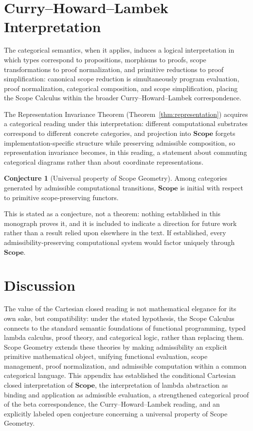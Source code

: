\documentclass[11pt,twoside,openright]{book}
\numberwithin{equation}{chapter}
\theoremstyle{definition}
\theoremstyle{plain}
\theoremstyle{remark}
\theoremstyle{definition}
\newtheorem{conjecture}[definition]{Conjecture}
\newcommand{\CatScope}{\mathbf{Scope}}
\begin{document}
\section{Curry--Howard--Lambek Interpretation}

The categorical semantics, when it applies, induces a logical
interpretation in which types correspond to propositions, morphisms to
proofs, scope transformations to proof normalization, and primitive
reductions to proof simplification: canonical scope reduction is
simultaneously program evaluation, proof normalization, categorical
composition, and scope simplification, placing the Scope Calculus within
the broader Curry--Howard--Lambek correspondence.

The Representation Invariance Theorem (Theorem~\ref{thm:representation})
acquires a categorical reading under this interpretation: different
computational substrates correspond to different concrete categories, and
projection into $\CatScope$ forgets implementation-specific structure
while preserving admissible composition, so representation invariance
becomes, in this reading, a statement about commuting categorical
diagrams rather than about coordinate representations.

\begin{conjecture}[Universal property of Scope Geometry]
Among categories generated by admissible computational transitions,
$\CatScope$ is initial with respect to primitive scope-preserving
functors.
\end{conjecture}

This is stated as a conjecture, not a theorem: nothing established in
this monograph proves it, and it is included to indicate a direction for
future work rather than a result relied upon elsewhere in the text. If
established, every admissibility-preserving computational system would
factor uniquely through $\CatScope$.

\section{Discussion}

The value of the Cartesian closed reading is not mathematical elegance
for its own sake, but compatibility: under the stated hypothesis, the
Scope Calculus connects to the standard semantic foundations of
functional programming, typed lambda calculus, proof theory, and
categorical logic, rather than replacing them. Scope Geometry extends
these theories by making admissibility an explicit primitive mathematical
object, unifying functional evaluation, scope management, proof
normalization, and admissible computation within a common categorical
language. This appendix has established the conditional Cartesian closed
interpretation of $\CatScope$, the interpretation of lambda abstraction as
binding and application as admissible evaluation, a strengthened
categorical proof of the beta correspondence, the Curry--Howard--Lambek
reading, and an explicitly labeled open conjecture concerning a universal
property of Scope Geometry.
\end{document}
